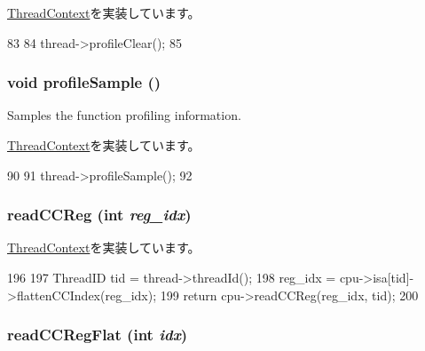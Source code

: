 \hyperlink{classThreadContext_ac9ebb698bd789f38c55af10256aab7e8}{ThreadContext}を実装しています。


\begin{DoxyCode}
83 {
84     thread->profileClear();
85 }
\end{DoxyCode}
\hypertarget{classInOrderThreadContext_aba547b904bdcf83196f983f79d285caf}{
\subsubsection[{profileSample}]{\setlength{\rightskip}{0pt plus 5cm}void profileSample ()}}
\label{classInOrderThreadContext_aba547b904bdcf83196f983f79d285caf}
Samples the function profiling information. 

\hyperlink{classThreadContext_a46e9ef08695527c8b4bd0e668bced5a8}{ThreadContext}を実装しています。


\begin{DoxyCode}
90 {
91     thread->profileSample();
92 }
\end{DoxyCode}
\hypertarget{classInOrderThreadContext_ac3d147c535052bfb1f8e8fe0697168d7}{
\subsubsection[{readCCReg}]{ readCCReg (int {\em reg\_\-idx})}}
\label{classInOrderThreadContext_ac3d147c535052bfb1f8e8fe0697168d7}


\hyperlink{classThreadContext_af924a3ae757b2a311dd16bc8acde1c27}{ThreadContext}を実装しています。


\begin{DoxyCode}
196 {
197     ThreadID tid = thread->threadId();
198     reg_idx = cpu->isa[tid]->flattenCCIndex(reg_idx);
199     return cpu->readCCReg(reg_idx, tid);
200 }
\end{DoxyCode}
\hypertarget{classInOrderThreadContext_a78f8bb511732f8abab3bd11a18d32072}{
\subsubsection[{readCCRegFlat}]{ readCCRegFlat (int {\em idx})}}
\label{classInOrderThreadContext_a78f8bb511732f8abab3bd11a18d32072}


